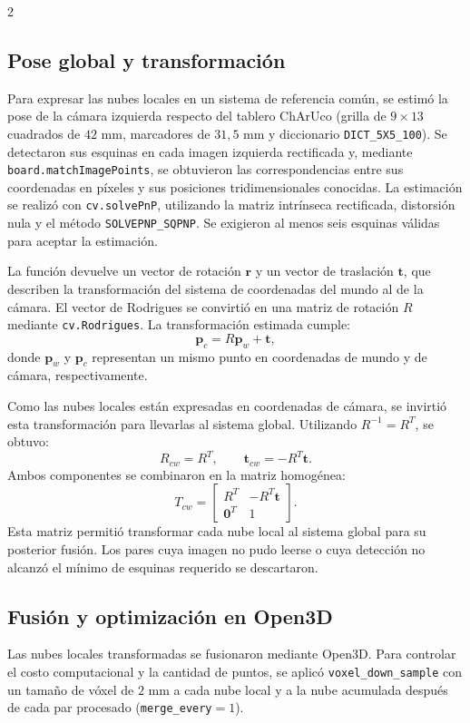 \documentclass[10pt,a4paper]{article}
\begin{document}
\begin{multicols}{2}
\subsection{Pose global y transformación}
Para expresar las nubes locales en un sistema de referencia común, se estimó la pose de la cámara izquierda respecto
del tablero ChArUco (grilla de $9\times13$ cuadrados de $42$ mm, marcadores de $31{,}5$ mm y diccionario \texttt{DICT\_5X5\_100}). Se detectaron sus esquinas en cada imagen izquierda rectificada y, mediante \texttt{board.matchImagePoints}, 
se obtuvieron las correspondencias entre sus coordenadas en píxeles y sus posiciones tridimensionales conocidas. 
La estimación se realizó con \texttt{cv.solvePnP}, utilizando la matriz intrínseca rectificada, distorsión nula y el método 
\texttt{SOLVEPNP\_SQPNP}. Se exigieron al menos seis esquinas válidas para aceptar la estimación.

La función devuelve un vector de rotación $\mathbf{r}$ y un vector de traslación $\mathbf{t}$, que describen la 
transformación del sistema de coordenadas del mundo al de la cámara. El vector de Rodrigues se convirtió en una matriz 
de rotación $R$ mediante \texttt{cv.Rodrigues}. La transformación estimada cumple:
\[
\mathbf{p}_c=R\mathbf{p}_w+\mathbf{t},
\]
donde $\mathbf{p}_w$ y $\mathbf{p}_c$ representan un mismo punto en coordenadas de mundo y de cámara, respectivamente.

Como las nubes locales están expresadas en coordenadas de cámara, se invirtió esta transformación para llevarlas al 
sistema global. Utilizando $R^{-1}=R^T$, se obtuvo:
\[
R_{cw}=R^T,\qquad \mathbf{t}_{cw}=-R^T\mathbf{t}.
\]
Ambos componentes se combinaron en la matriz homogénea:
\[
T_{cw}=
\begin{bmatrix}
R^T & -R^T\mathbf{t}\\
\mathbf{0}^T & 1
\end{bmatrix}.
\]
Esta matriz permitió transformar cada nube local al sistema global para su posterior fusión. Los pares 
cuya imagen no pudo leerse o cuya detección no alcanzó el mínimo de esquinas requerido se descartaron.

\subsection{Fusión y optimización en Open3D}
Las nubes locales transformadas se fusionaron mediante Open3D. Para controlar el costo computacional y la 
cantidad de puntos, se aplicó \texttt{voxel\_down\_sample} con un tamaño de vóxel de $2$ mm a cada nube local 
y a la nube acumulada después de cada par procesado (\texttt{merge\_every}$=1$).


\end{multicols}
\end{document}
